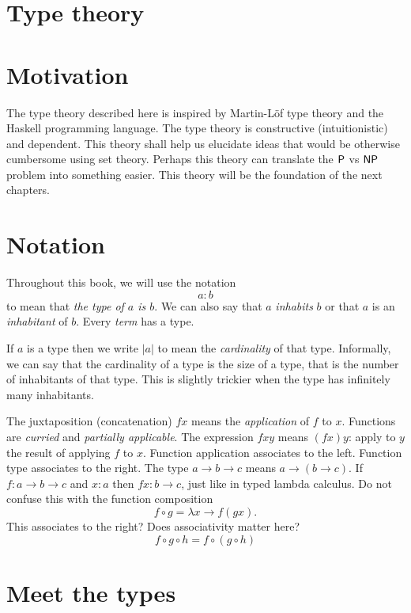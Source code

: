\section{Type theory}

\section{Motivation}

The type theory described here is inspired by
Martin-L\"of type theory
and the Haskell programming language.
The type theory is constructive (intuitionistic) and dependent.
This theory shall help us elucidate ideas that
would be otherwise cumbersome using set theory.
Perhaps this theory can translate the $\mathsf{P}$ vs $\mathsf{NP}$ problem
into something easier.
This theory will be the foundation
of the next chapters.

\section{Notation}

Throughout this book, we will use the notation
\[ a : b \]
to mean that \emph{the type of $a$ is $b$}.
We can also say that $a$ \emph{inhabits} $b$
or that $a$ is an \emph{inhabitant} of $b$.
Every \emph{term} has a type.

If $a$ is a type then we write $|a|$ to mean the \emph{cardinality} of that type.
Informally, we can say that the cardinality of a type
is the size of a type, that is the number of inhabitants of that type.
This is slightly trickier when the type has infinitely many inhabitants.

The juxtaposition (concatenation) $f x$ means the \emph{application} of $f$ to $x$.
Functions are \emph{curried} and \emph{partially applicable}.
The expression $f x y$ means $(f x) y$:
apply to $y$ the result of applying $f$ to $x$.
Function application associates to the left.
Function type associates to the right.
The type $a \to b \to c$ means $a \to (b \to c)$.
If $f : a \to b \to c$ and $x : a$ then $f x : b \to c$,
just like in typed lambda calculus.
Do not confuse this with the function composition
\[ f \circ g = \lambda x \to f (g x). \]
This associates to the right?
Does associativity matter here?
\[
    f \circ g \circ h = f \circ (g \circ h)
\]


\section{Meet the types}

